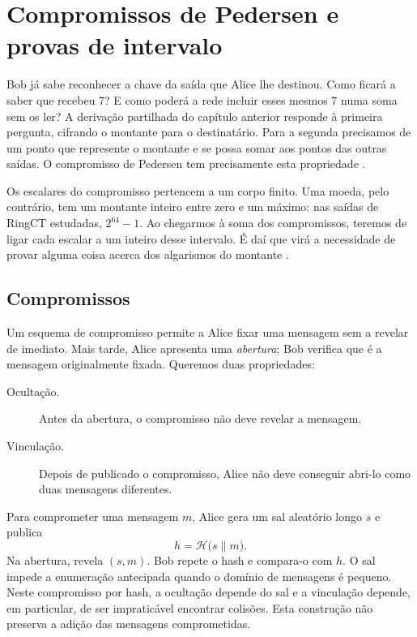 \chapter{Compromissos de Pedersen e provas de intervalo}
\label{chapter:pedersen-commitments}

Bob já sabe reconhecer a chave da saída que Alice lhe destinou.
Como ficará a saber que recebeu 7? E como poderá a rede incluir
esses mesmos 7 numa soma sem os ler? A derivação partilhada do
capítulo anterior responde à primeira pergunta, cifrando o montante
para o destinatário. Para a segunda precisamos de um ponto que
represente o montante e se possa somar aos pontos das outras saídas.
O compromisso de Pedersen tem precisamente esta propriedade
\cite{Pedersen1992,MRL-0005-ringct}.

Os escalares do compromisso pertencem a um corpo finito. Uma moeda,
pelo contrário, tem um montante inteiro entre zero e um máximo:
nas saídas de RingCT estudadas, \(2^{64}-1\). Ao chegarmos à soma
dos compromissos, teremos de ligar cada escalar a um inteiro desse
intervalo. É daí que virá a necessidade de provar alguma coisa
acerca dos algarismos do montante \cite{monero-source-v16}.

\section{Compromissos}
\label{sec:commitments}

Um esquema de compromisso permite a Alice fixar uma mensagem sem a revelar de
imediato. Mais tarde, Alice apresenta uma \emph{abertura}; Bob verifica que é
a mensagem originalmente fixada. Queremos duas propriedades:

\begin{description}
 \item[Ocultação.] Antes da abertura, o compromisso não deve revelar a
 mensagem.
 \item[Vinculação.] Depois de publicado o compromisso, Alice não deve
 conseguir abri-lo como duas mensagens diferentes.
\end{description}

Para comprometer uma mensagem \(m\), Alice gera um sal aleatório longo \(s\) e
publica
\[
 h=\mathcal H\bigl(s\mathbin\|m\bigr).
\]
Na abertura, revela \((s,m)\). Bob repete o hash e compara-o com \(h\). O sal
impede a enumeração antecipada quando o domínio de mensagens é pequeno. Neste
compromisso por hash, a ocultação depende do sal e a vinculação depende, em
particular, de ser impraticável encontrar colisões. Esta construção não
preserva a adição das mensagens comprometidas.

